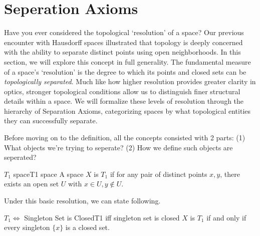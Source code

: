 \documentclass[12pt, a4paper, twoside]{article}
\theoremstyle{plain}
\begin{document}
\begin{center}
\end{center}

\newpage 

\section{Seperation Axioms}

Have you ever considered the topological \lq resolution' of a space? 
Our previous encounter with Hausdorff spaces illustrated that topology is deeply concerned with the ability to separate distinct points using open neighborhoods. 
In this section, we will explore this concept in full generality. The fundamental measure of a space's \lq resolution' is the degree to which its points and closed sets can be \textit{topologically separated}. 
Much like how higher resolution provides greater clarity in optics, stronger topological conditions allow us to distinguish finer structural details within a space. We will formalize these levels of resolution through the hierarchy of Separation Axioms, categorizing spaces by what topological entities they can successfully separate.

Before moving on to the definition, all the concepts consisted with 2 parts: (1) What objects we're trying to seperate? (2) How we define such objects are seperated? 

\begin{defn}{$T_1$ space}{T1 space}
    A space $X$ is $T_1$ if for any pair of distinct points $x, y$, there exists an open set $U$ with $x \in U, y \notin U$. 
\end{defn}

Under this basic resolution, we can state following. 

\begin{prop}{$T_1 \iff$ Singleton Set is Closed}{T1 iff singleton set is closed}
    $X$ is $T_1$ if and only if every singleton $\{x\}$ is a closed set. 
\end{prop}
\end{document}

